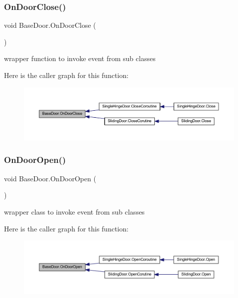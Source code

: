 \subsubsection{\texorpdfstring{On\+Door\+Close()}{OnDoorClose()}}
{\footnotesize\ttfamily void Base\+Door.\+On\+Door\+Close (\begin{DoxyParamCaption}{ }\end{DoxyParamCaption})\hspace{0.3cm}{\ttfamily [protected]}}



wrapper function to invoke event from sub classes 

Here is the caller graph for this function\+:
\nopagebreak
\begin{figure}[H]
\begin{center}
\leavevmode
\includegraphics[width=350pt]{class_base_door_a3ce14aa6aca622f9d18e7054e76ec8d2_icgraph}
\end{center}
\end{figure}
\mbox{\label{class_base_door_af53bd804dcee24b1f2019c2d2e8e03c6}} 
\subsubsection{\texorpdfstring{On\+Door\+Open()}{OnDoorOpen()}}
{\footnotesize\ttfamily void Base\+Door.\+On\+Door\+Open (\begin{DoxyParamCaption}{ }\end{DoxyParamCaption})\hspace{0.3cm}{\ttfamily [protected]}}



wrapper class to invoke event from sub classes 

Here is the caller graph for this function\+:
\nopagebreak
\begin{figure}[H]
\begin{center}
\leavevmode
\includegraphics[width=350pt]{class_base_door_af53bd804dcee24b1f2019c2d2e8e03c6_icgraph}
\end{center}
\end{figure}
\mbox{\label{class_base_door_a418df6f73cc5c56b6989c0512a6a909b}} 
